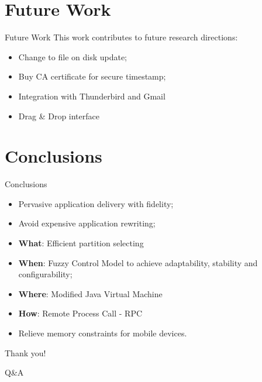 \section{Future Work}
\begin{frame}{Future Work}
This work contributes to future research directions:
\begin{itemize}
	\item Change to file on disk update;
	\item Buy CA certificate for secure timestamp;
	\item Integration with Thunderbird and Gmail
	\item Drag & Drop interface
\end{itemize}
\end{frame}


\section{Conclusions}
\begin{frame}{Conclusions}
\begin{itemize}
\item Pervasive application delivery with fidelity;
\item Avoid expensive application rewriting;
\item \textbf{What}: Efficient partition selecting 
\item \textbf{When}: Fuzzy Control Model to achieve adaptability, stability and configurability;
\item \textbf{Where}: Modified Java Virtual Machine 
\item \textbf{How}: Remote Process Call - RPC
\item Relieve memory constraints for mobile devices.
\end{itemize}
\end{frame}
		
\begin{frame}
\begin{center}
\huge Thank you!
\vspace{0.5cm}

\Large Q\&A
\end{center}
\end{frame}


